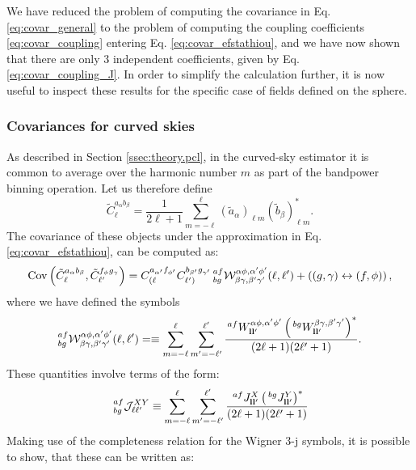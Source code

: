 \documentclass[a4paper,11pt]{article}
\begin{document}
    We have reduced the problem of computing the covariance in Eq. \ref{eq:covar_general} to the problem of computing the coupling coefficients \ref{eq:covar_coupling} entering Eq. \ref{eq:covar_efstathiou}, and we have now shown that there are only 3 independent coefficients, given by Eq. \ref{eq:covar_coupling_J}. In order to simplify the calculation further, it is now useful to inspect these results for the specific case of fields defined on the sphere.
    
    \subsubsection{Covariances for curved skies}
      As described in Section \ref{ssec:theory.pcl}, in the curved-sky estimator it is common to average over the harmonic number $m$ as part of the bandpower binning operation. Let us therefore define
      \begin{equation}
        \tilde{C}^{a_\alpha b_\beta}_\ell=\frac{1}{2\ell+1}\sum_{m=-\ell}^\ell (\tilde{a}_\alpha)_{\ell m} (\tilde{b}_\beta)_{\ell m}^*.
      \end{equation}
      The covariance of these objects under the approximation in Eq. \ref{eq:covar_efstathiou}, can be computed as:
      \begin{equation}\label{eq:cov_sph}
        {\rm Cov}\left(\tilde{C}^{a_\alpha b_\beta}_\ell,\tilde{C}^{f_\phi g_\gamma}_{\ell'}\right) = C^{a_{\alpha'} f_{\phi'}}_{(\ell}C^{b_{\beta'} g_{\gamma'}}_{\ell')}\,^{af}_{bg}\mathcal{W}^{\alpha\phi,\alpha'\phi'}_{\beta\gamma,\beta'\gamma'}(\ell,\ell')+\left((g,\gamma)\leftrightarrow(f,\phi)\right),
      \end{equation}
      where we have defined the symbols
      \begin{equation}
        ^{af}_{bg}\mathcal{W}^{\alpha\phi,\alpha'\phi'}_{\beta\gamma,\beta'\gamma'}(\ell,\ell')=\equiv\sum_{m=-\ell}^\ell \sum_{m'=-\ell'}^{\ell'}\frac{\,^{af}W^{\alpha\phi,\alpha'\phi'}_{{\bf l}{\bf l}'}\left(\,^{bg}W^{\beta\gamma,\beta'\gamma'}_{{\bf l}{\bf l}'}\right)^*}{(2\ell+1)(2\ell'+1)}.
      \end{equation}
      These quantities involve terms of the form:
      \begin{equation}
        \,^{af}_{bg}\mathcal{J}^{XY}_{\ell\ell'}\equiv\sum_{m=-\ell}^\ell \sum_{m'=-\ell'}^{\ell'}\frac{\,^{af}J^X_{{\bf l}{\bf l}'}\left(\,^{bg}J^Y_{{\bf l}{\bf l}'}\right)^*}{(2\ell+1)(2\ell'+1)}
      \end{equation}
      Making use of the completeness relation for the Wigner 3-j symbols, it is possible to show, that these can be written as:
\end{document}
